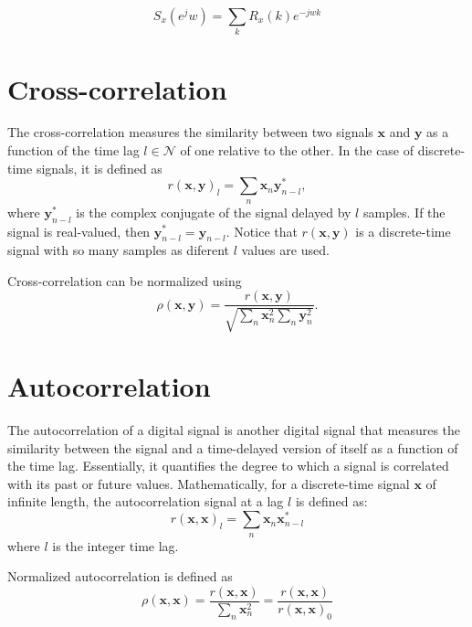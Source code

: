 \documentclass{article}
\begin{document}
\begin{equation}
  S_x(e^jw)=\sum_kR_x(k)e^{-jwk}
\end{equation}


\section{Cross-correlation}

The cross-correlation measures the similarity between two signals
$\mathbf{x}$ and $\mathbf{y}$ as a function of the time lag
$l\in\mathcal{N}$ of one relative to the other. In the case of
discrete-time signals, it is defined as
\begin{equation}
  {r(\mathbf{x},\mathbf{y})}_l=\sum_n{\mathbf{x}}_n \mathbf{y}^*_{n-l},
\end{equation}
where $\mathbf{y}^* _{n-l}$ is the complex conjugate of the signal
delayed by $l$ samples. If the signal is real-valued, then
$\mathbf{y}^*_{n-l}=\mathbf{y}_{n-l}$. Notice that
${r(\mathbf{x},\mathbf{y})}$ is a discrete-time signal with so many
samples as diferent $l$ values are used.

Cross-correlation can be normalized using
\begin{equation}
  \rho(\mathbf{x},\mathbf{y})=\frac{{r(\mathbf{x},\mathbf{y})}}{\sqrt{\sum_n \mathbf{x}_n^2 \sum_n \mathbf{y}_n^2}}.
\end{equation}


\section{Autocorrelation}
\label{sec:autocorrelation}

The autocorrelation of a digital signal is another digital signal that
measures the similarity between the signal and a time-delayed version
of itself as a function of the time lag. Essentially, it quantifies
the degree to which a signal is correlated with its past or future
values. Mathematically, for a discrete-time signal $\mathbf{x}$ of
infinite length, the autocorrelation signal at a lag $l$ is defined
as:
\begin{equation}
  {r(\mathbf{x},\mathbf{x})}_l=\sum_n{\mathbf{x}}_n \mathbf{x}^*_{n-l}
\end{equation}
where $l$ is the integer time lag.

Normalized autocorrelation is defined as
\begin{equation}
  {\rho(\mathbf{x},\mathbf{x})} = \frac{{r(\mathbf{x},\mathbf{x})}}{\sum_n \mathbf{x}_n^2} = \frac{{r(\mathbf{x},\mathbf{x})}}{{r(\mathbf{x},\mathbf{x})}_0}
\end{equation}
\end{document}
